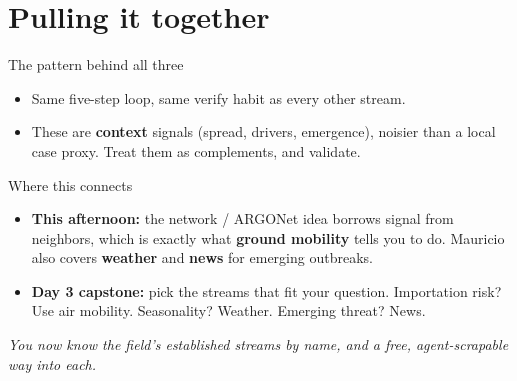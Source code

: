 \documentclass[aspectratio=169,11pt]{beamer}
\begin{document}
\section{Pulling it together}

\begin{frame}{The pattern behind all three}
  \begin{center}
  \end{center}
  \vspace{0.3em}
  \begin{itemize}
    \item Same five-step loop, same verify habit as every other stream.
    \item These are \textbf{context} signals (spread, drivers, emergence), noisier than a
          local case proxy. Treat them as complements, and validate.
  \end{itemize}
\end{frame}

\begin{frame}{Where this connects}
  \begin{itemize}
    \item \textbf{This afternoon:} the network / ARGONet idea borrows signal from neighbors,
          which is exactly what \textbf{ground mobility} tells you to do. Mauricio also covers
          \textbf{weather} and \textbf{news} for emerging outbreaks.
    \item \textbf{Day 3 capstone:} pick the streams that fit your question. Importation risk?
          Use air mobility. Seasonality? Weather. Emerging threat? News.
  \end{itemize}
  \vfill
  \begin{center}
    \itshape You now know the field's established streams by name, and a free, agent-scrapable
    way into each.
  \end{center}
\end{frame}
\end{document}
